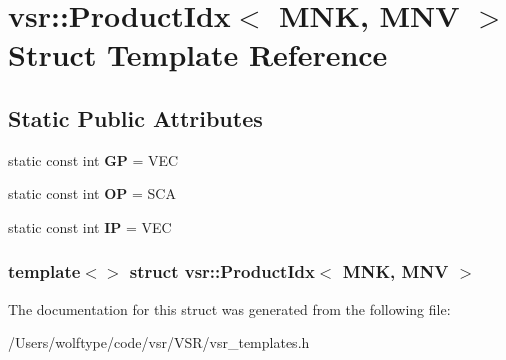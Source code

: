 \hypertarget{structvsr_1_1_product_idx_3_01_m_n_k_00_01_m_n_v_01_4}{\section{vsr\-:\-:Product\-Idx$<$ M\-N\-K, M\-N\-V $>$ Struct Template Reference}
\label{structvsr_1_1_product_idx_3_01_m_n_k_00_01_m_n_v_01_4}
}
\subsection*{Static Public Attributes}
\begin{DoxyCompactItemize}
\item 
\hypertarget{structvsr_1_1_product_idx_3_01_m_n_k_00_01_m_n_v_01_4_aad126ba800ec52a2984872f9356497cc}{static const int {\bfseries G\-P} = V\-E\-C}\label{structvsr_1_1_product_idx_3_01_m_n_k_00_01_m_n_v_01_4_aad126ba800ec52a2984872f9356497cc}

\item 
\hypertarget{structvsr_1_1_product_idx_3_01_m_n_k_00_01_m_n_v_01_4_a1a267dc4ac440db88bb7d6318ceda22c}{static const int {\bfseries O\-P} = S\-C\-A}\label{structvsr_1_1_product_idx_3_01_m_n_k_00_01_m_n_v_01_4_a1a267dc4ac440db88bb7d6318ceda22c}

\item 
\hypertarget{structvsr_1_1_product_idx_3_01_m_n_k_00_01_m_n_v_01_4_a1e2073c84dd0a50587c6108cdccce8e0}{static const int {\bfseries I\-P} = V\-E\-C}\label{structvsr_1_1_product_idx_3_01_m_n_k_00_01_m_n_v_01_4_a1e2073c84dd0a50587c6108cdccce8e0}

\end{DoxyCompactItemize}
\subsubsection*{template$<$$>$ struct vsr\-::\-Product\-Idx$<$ M\-N\-K, M\-N\-V $>$}



The documentation for this struct was generated from the following file\-:\begin{DoxyCompactItemize}
\item 
/\-Users/wolftype/code/vsr/\-V\-S\-R/vsr\-\_\-templates.\-h\end{DoxyCompactItemize}
